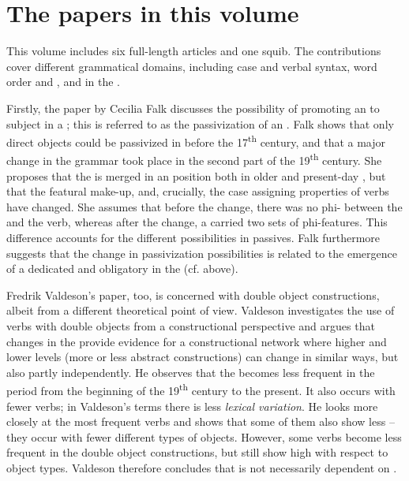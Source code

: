 \documentclass[output=paper]{langscibook}
\begin{document}
\section{The papers in this volume}\label{sec:intro:4}


This volume includes six full-length articles and one squib. The contributions cover different grammatical domains, including case and verbal syntax, word order and , and  in the . 



Firstly, the paper by Cecilia Falk discusses the possibility of promoting an  to subject in a ; this is referred to as the passivization of an . Falk shows that only direct objects could be passivized in  before the 17\textsuperscript{th} century, and that a major change in the grammar took place in the second part of the 19\textsuperscript{th} century. She proposes that the  is merged in an  position both in older and present-day , but that the featural make-up, and, crucially, the case assigning properties of  verbs have changed. She assumes that before the change, there was no phi- between the  and the verb, whereas after the change, a  carried two sets of phi-features. This difference accounts for the different possibilities in passives. Falk furthermore suggests that the change in passivization possibilities is related to the emergence of a dedicated and obligatory  in the  (cf.  above).



Fredrik Valdeson’s paper, too, is concerned with double object constructions, albeit from a different theoretical point of view. Valdeson investigates the use of verbs with double objects from a constructional perspective and argues that changes in the  provide evidence for a constructional network where higher and lower levels (more or less abstract constructions) can change in similar ways, but also partly independently. He observes that the  becomes less frequent in the period from the beginning of the 19\textsuperscript{th} century to the present. It also occurs with fewer verbs; in Valdeson’s terms there is less \textit{lexical variation}. He looks more closely at the most frequent verbs and shows that some of them also show less  – they occur with fewer different types of objects. However, some verbs become less frequent in the double object constructions, but still show high  with respect to object types. Valdeson therefore concludes that  is not necessarily dependent on .
\end{document}
